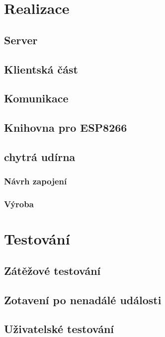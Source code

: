 \documentclass[thesis=B,czech]{FITthesis}[2019/12/23]
\begin{document}
\chapter{Realizace}

\section{Server}

\section{Klientská část}

\section{Komunikace}

\section{Knihovna pro ESP8266}

\section{chytrá udírna}

\subsection{Návrh zapojení}

\subsection{Výroba}



\chapter{Testování}

\section{Zátěžové testování}

\section{Zotavení po nenadálé události}

\section{Uživatelské testování}
\end{document}
